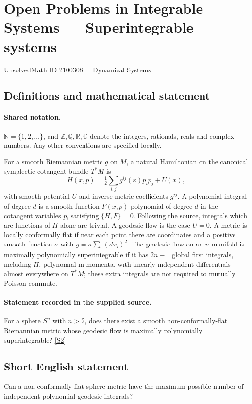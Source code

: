 \documentclass[11pt]{article}
\newcommand{\sref}[2]{\hyperlink{source:#1:#2}{[S#2]}}
\begin{document}
\setcounter{section}{2100307}
\section{Open Problems in Integrable Systems — Superintegrable systems}\label{2100308}
{\small\sffamily UnsolvedMath ID 2100308 · Dynamical Systems}
\subsection{Definitions and mathematical statement}

\paragraph{Shared notation.}$\mathbb N=\{1,2,\ldots\}$, and $\mathbb Z,\mathbb Q,\mathbb R,\mathbb C$ denote the integers, rationals, reals and complex numbers. Any other conventions are specified locally.


For a smooth Riemannian metric $g$ on $M$, a natural Hamiltonian on the canonical symplectic cotangent bundle $T^*M$ is \[H(x,p)=\tfrac12\sum_{i,j}g^{ij}(x)p_ip_j+U(x),\] with smooth potential $U$ and inverse metric coefficients $g^{ij}$. A polynomial integral of degree $d$ is a smooth function $F(x,p)$ polynomial of degree $d$ in the cotangent variables $p$, satisfying $\{H,F\}=0$. Following the source, integrals which are functions of $H$ alone are trivial. A geodesic flow is the case $U=0$. A metric is locally conformally flat if near each point there are coordinates and a positive smooth function $a$ with $g=a\sum_i(dx_i)^2$. The geodesic flow on an $n$-manifold is maximally polynomially superintegrable if it has $2n-1$ global first integrals, including $H$, polynomial in momenta, with linearly independent differentials almost everywhere on $T^*M$; these extra integrals are not required to mutually Poisson commute.
\paragraph{Statement recorded in the supplied source.}
For a sphere $S^n$ with $n>2$, does there exist a smooth non-conformally-flat Riemannian metric whose geodesic flow is maximally polynomially superintegrable? \sref{2100308}{2}
\subsection{Short English statement}
Can a non-conformally-flat sphere metric have the maximum possible number of independent polynomial geodesic integrals?
\end{document}
